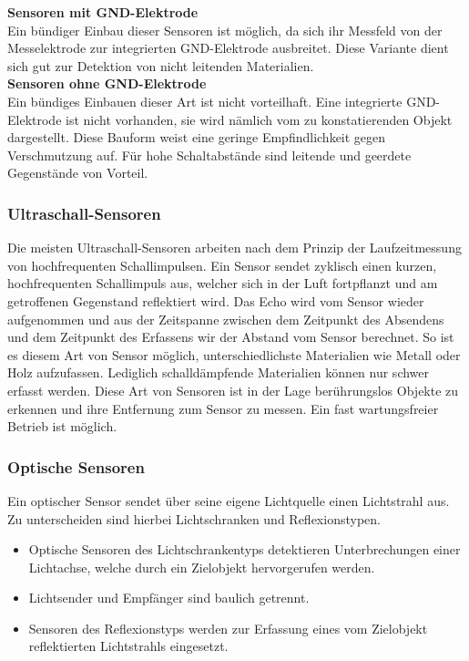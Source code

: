 \textbf{Sensoren mit GND-Elektrode} \\
Ein bündiger Einbau dieser Sensoren ist möglich, da sich ihr Messfeld von der Messelektrode zur integrierten GND-Elektrode ausbreitet.
Diese Variante dient sich gut zur Detektion von nicht leitenden Materialien. \\

\textbf{Sensoren ohne GND-Elektrode} \\
Ein bündiges Einbauen dieser Art ist nicht vorteilhaft.
Eine integrierte GND-Elektrode ist nicht vorhanden, sie wird nämlich vom zu konstatierenden Objekt dargestellt.
Diese Bauform weist eine geringe Empfindlichkeit gegen Verschmutzung auf.
Für hohe Schaltabstände sind leitende und geerdete Gegenstände von Vorteil.

\subsubsection{Ultraschall-Sensoren}
Die meisten Ultraschall-Sensoren arbeiten nach dem Prinzip der Laufzeitmessung von hochfrequenten Schallimpulsen.
Ein Sensor sendet zyklisch einen kurzen, hochfrequenten Schallimpuls aus, welcher sich in der Luft fortpflanzt und am getroffenen Gegenstand reflektiert wird.
Das Echo wird vom Sensor wieder aufgenommen und aus der Zeitspanne zwischen dem Zeitpunkt des Absendens und dem Zeitpunkt des Erfassens wir der Abstand vom Sensor berechnet.
So ist es diesem Art von Sensor möglich, unterschiedlichste Materialien wie Metall oder Holz aufzufassen.
Lediglich schalldämpfende Materialien können nur schwer erfasst werden.
Diese Art von Sensoren ist in der Lage berührungslos Objekte zu erkennen und ihre Entfernung zum Sensor zu messen.
Ein fast wartungsfreier Betrieb ist möglich.

\subsubsection{Optische Sensoren}
Ein optischer Sensor sendet über seine eigene Lichtquelle einen Lichtstrahl aus.
Zu unterscheiden sind hierbei Lichtschranken und Reflexionstypen.

\begin{itemize}
\item Optische Sensoren des Lichtschrankentyps detektieren Unterbrechungen einer Lichtachse, welche durch ein Zielobjekt hervorgerufen werden.
\item Lichtsender und Empfänger sind baulich getrennt.

\item Sensoren des Reflexionstyps werden zur Erfassung eines vom Zielobjekt reflektierten Lichtstrahls eingesetzt.
\end{itemize}

